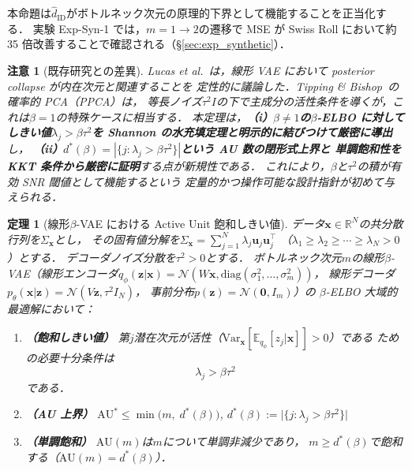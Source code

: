 \documentclass[11pt,a4paper]{jsarticle}
\newtheorem{theorem}{定理}
\newtheorem{remark}{注意}
\newcommand{\R}{\mathbb{R}}
\begin{document}
本命題は$\hat{d}_\mathrm{ID}$がボトルネック次元の原理的下界として機能することを正当化する．
実験 Exp-Syn-1 では，$m = 1 \to 2$の遷移で MSE が Swiss Roll において約 35 倍改善することで確認される（§\ref{sec:exp_synthetic}）．

\begin{remark}[既存研究との差異]
Lucas et al.~\cite{lucas2019elbo}は，線形 VAE において posterior collapse が内在次元と関連することを
定性的に議論した．Tipping \& Bishop~\cite{tippingbishop1999ppca}の確率的 PCA（PPCA）は，
等長ノイズ$\tau^2 I$の下で主成分の活性条件を導くが，これは$\beta = 1$の特殊ケースに相当する．
本定理は，\textbf{（i）$\beta \neq 1$の$\beta$-ELBO に対してしきい値$\lambda_j > \beta\tau^2$を
Shannon の水充填定理\cite{cover2006elements}と明示的に結びつけて厳密に導出}し，
\textbf{（ii）$d^*(\beta) = |\{j:\lambda_j > \beta\tau^2\}|$という AU 数の閉形式上界と
単調飽和性を KKT 条件から厳密に証明}する点が新規性である．
これにより，$\beta$と$\tau^2$の積が有効 SNR 閾値として機能するという
定量的かつ操作可能な設計指針が初めて与えられる．
\end{remark}

\begin{theorem}[線形$\beta$-VAE における Active Unit 飽和しきい値]\label{thm:linear_vae}
データ$\boldsymbol{x} \in \R^N$の共分散行列を$\Sigma_{\boldsymbol{x}}$とし，
その固有値分解を$\Sigma_{\boldsymbol{x}} = \sum_{j=1}^{N} \lambda_j \boldsymbol{u}_j \boldsymbol{u}_j^\top$
（$\lambda_1 \geq \lambda_2 \geq \cdots \geq \lambda_N > 0$）とする．
デコーダノイズ分散を$\tau^2 > 0$とする．
ボトルネック次元$m$の線形$\beta$-VAE（線形エンコーダ$q_\phi(\boldsymbol{z}|\boldsymbol{x}) = \mathcal{N}(W\boldsymbol{x}, \mathrm{diag}(\sigma_1^2,\ldots,\sigma_m^2))$，
線形デコーダ$p_\theta(\boldsymbol{x}|\boldsymbol{z}) = \mathcal{N}(V\boldsymbol{z}, \tau^2 I_N)$，
事前分布$p(\boldsymbol{z}) = \mathcal{N}(\boldsymbol{0}, I_m)$）の
$\beta$-ELBO 大域的最適解において：

\begin{enumerate}
  \item \textbf{（飽和しきい値）} 第$j$潜在次元が活性（$\mathrm{Var}_{\boldsymbol{x}}[\mathbb{E}_{q_\phi}[z_j|\boldsymbol{x}]] > 0$）である
        ための必要十分条件は
        \begin{equation}
          \lambda_j > \beta \tau^2 \label{eq:au_threshold}
        \end{equation}
        である．
  \item \textbf{（AU 上界）}
        $\mathrm{AU}^* \leq \min\bigl(m,\; d^*(\beta)\bigr)$,\quad
        $d^*(\beta) := \bigl|\{j : \lambda_j > \beta\tau^2\}\bigr|$
  \item \textbf{（単調飽和）}
        $\mathrm{AU}(m)$は$m$について単調非減少であり，
        $m \geq d^*(\beta)$で飽和する（$\mathrm{AU}(m) = d^*(\beta)$）．
\end{enumerate}
\end{theorem}
\end{document}
